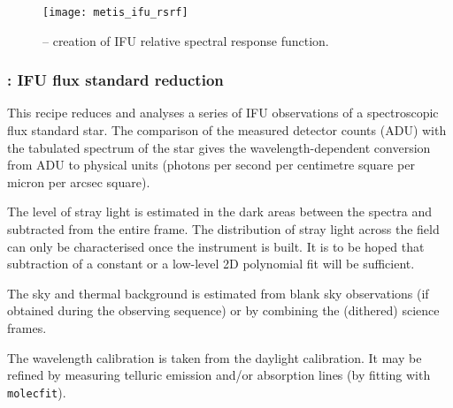 \begin{figure}[hb]
  \centering
  \texttt{[image: metis\_ifu\_rsrf]}
  \caption[Recipe: ]{ --
    creation of IFU relative spectral response function.}
  \label{fig:metis_ifu_rsrf}
\end{figure}


\clearpage
\subsubsection{: IFU flux standard reduction}
\label{sssec:ifu_std_process}
\label{rec:metis_ifu_std_process}

This recipe reduces and analyses a series of IFU observations of a
spectroscopic flux standard star. The comparison of the measured
detector counts (ADU) with the tabulated spectrum of the star gives
the wavelength-dependent conversion from ADU to physical units
(photons per second per centimetre square per micron per arcsec square).

The level of stray light is estimated in the dark areas between the
spectra and subtracted from the entire frame. The distribution of
stray light across the field can only be characterised once the
instrument is built. It is to be hoped that subtraction of a constant
or a low-level 2D polynomial fit will be sufficient.

The sky and thermal background is estimated from blank sky
observations (if obtained during the observing sequence) or by
combining the (dithered) science frames.

The wavelength calibration is taken from the daylight calibration. It
may be refined by measuring telluric emission and/or absorption lines
(by fitting with \lstinline{molecfit}).

